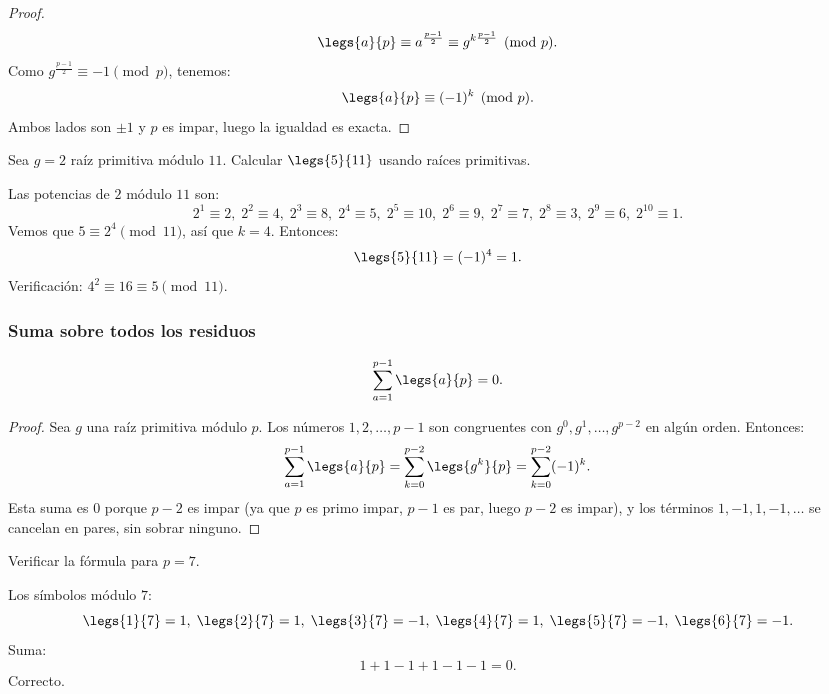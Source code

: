 \begin{proof}
\[
\legs{a}{p} \equiv a^{\frac{p-1}{2}} \equiv g^{k\frac{p-1}{2}} \pmod{p}.
\]
Como $g^{\frac{p-1}{2}} \equiv -1 \pmod{p}$, tenemos:
\[
\legs{a}{p} \equiv (-1)^k \pmod{p}.
\]
Ambos lados son $\pm 1$ y $p$ es impar, luego la igualdad es exacta.
\end{proof}

\begin{ejemplo}
Sea $g = 2$ raíz primitiva módulo $11$. Calcular $\legs{5}{11}$ usando raíces primitivas.
\end{ejemplo}
\begin{solucion}
Las potencias de $2$ módulo $11$ son:
\[
2^1 \equiv 2,\; 2^2 \equiv 4,\; 2^3 \equiv 8,\; 2^4 \equiv 5,\; 2^5 \equiv 10,\; 2^6 \equiv 9,\; 2^7 \equiv 7,\; 2^8 \equiv 3,\; 2^9 \equiv 6,\; 2^{10} \equiv 1.
\]
Vemos que $5 \equiv 2^4 \pmod{11}$, así que $k = 4$. Entonces:
\[
\legs{5}{11} = (-1)^4 = 1.
\]
Verificación: $4^2 \equiv 16 \equiv 5 \pmod{11}$.
\end{solucion}

\subsubsection{Suma sobre todos los residuos}

\begin{proposicion}
\[
\sum_{a=1}^{p-1} \legs{a}{p} = 0.
\]
\end{proposicion}

\begin{proof}
Sea $g$ una raíz primitiva módulo $p$. Los números $1, 2, \ldots, p-1$ son congruentes con $g^0, g^1, \ldots, g^{p-2}$ en algún orden. Entonces:
\[
\sum_{a=1}^{p-1} \legs{a}{p} = \sum_{k=0}^{p-2} \legs{g^k}{p} = \sum_{k=0}^{p-2} (-1)^k.
\]
Esta suma es $0$ porque $p-2$ es impar (ya que $p$ es primo impar, $p-1$ es par, luego $p-2$ es impar), y los términos $1, -1, 1, -1, \ldots$ se cancelan en pares, sin sobrar ninguno.
\end{proof}

\begin{ejemplo}
Verificar la fórmula para $p = 7$.
\end{ejemplo}
\begin{solucion}
Los símbolos módulo $7$:
\[
\legs{1}{7} = 1,\; \legs{2}{7} = 1,\; \legs{3}{7} = -1,\; \legs{4}{7} = 1,\; \legs{5}{7} = -1,\; \legs{6}{7} = -1.
\]
Suma:
\[
1 + 1 - 1 + 1 - 1 - 1 = 0.
\]
Correcto.
\end{solucion}

